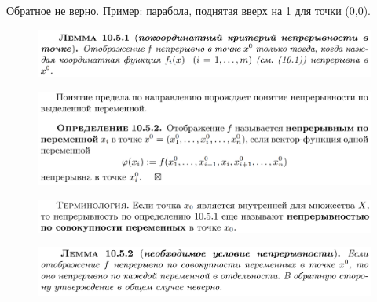 \documentclass{article}
\begin{document}
Обратное не верно. Пример: парабола, поднятая вверх на 1 для точки (0,0).
\begin{figure}[h!]
    \centering
    \vspace{-1cm}
\end{figure}
\begin{figure}[h!]
    \centering
    \includegraphics[width=\textwidth]{23.png}
    \vspace{-1cm}
\end{figure}
\begin{figure}[h!]
    \centering
    \includegraphics[width=\textwidth]{24.png}
    \vspace{-1cm}
\end{figure}
\begin{figure}[h!]
    \centering
    \includegraphics[width=\textwidth]{25.png}
    \vspace{-1cm}
\end{figure}
\begin{figure}[h!]
    \centering
    \includegraphics[width=\textwidth]{26.png}
    \vspace{-1cm}
\end{figure}
\end{document}
